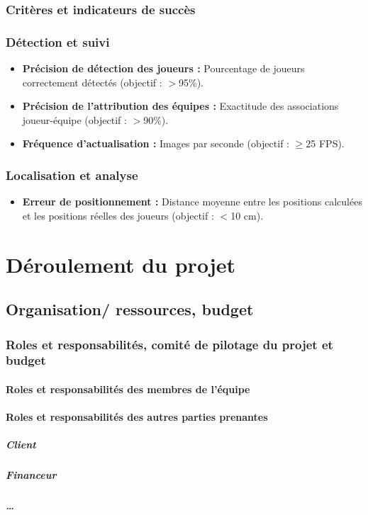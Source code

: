 \subsubsection{Critères et indicateurs de succès}
\subsubsection*{Détection et suivi}
\begin{itemize}
    \item \textbf{Précision de détection des joueurs :} Pourcentage de joueurs correctement détectés (objectif : $>$95\%).
    \item \textbf{Précision de l’attribution des équipes :} Exactitude des associations joueur-équipe (objectif : $>$90\%).
    \item \textbf{Fréquence d’actualisation :} Images par seconde (objectif : $\geq$25 FPS).
\end{itemize}

\subsubsection*{Localisation et analyse}
\begin{itemize}
    \item \textbf{Erreur de positionnement :} Distance moyenne entre les positions calculées et les positions réelles des joueurs (objectif : $<$10 cm).
\end{itemize}

\section{Déroulement du projet}
\subsection{Organisation/ ressources, budget}
\subsubsection{Roles et responsabilités, comité de pilotage du projet et budget}
\paragraph{Roles et responsabilités des membres de l'équipe}
\paragraph{Roles et responsabilités des autres parties prenantes}
    \subparagraph{Client}
    \subparagraph{Financeur}
    \subparagraph{\dots}
